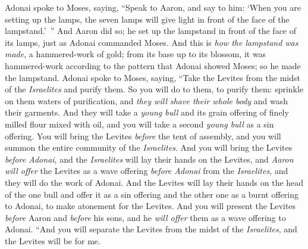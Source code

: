 \begin{biblechapter} %
 Adonai spoke to Moses, saying,
\verse “Speak to Aaron, and say to him: ‘When you are setting up the lamps, the seven lamps will give light in front of the face of the lampstand.’ ”
\verse And Aaron did so; he set up the lampstand in front of the face of its lamps, just as Adonai commanded Moses.
\verse And this is \textit{how the lampstand was made}, a hammered-work of gold; from its base up to its blossom, it was hammered-work according to the pattern that Adonai showed Moses; so he made the lampstand.
 Adonai spoke to Moses, saying,
\verse “Take the Levites from the midst of the \textit{Israelites} and purify them.
\verse So you will do to them, to purify them: sprinkle on them waters of purification, and \textit{they will shave their whole body} and wash their garments.
\verse And they will take a \textit{young bull} and its grain offering of finely milled flour mixed with oil, and you will take a second \textit{young bull} as a sin offering.
\verse You will bring the Levites \textit{before} the tent of assembly, and you will summon the entire community of the \textit{Israelites}.
\verse And you will bring the Levites \textit{before Adonai}, and the \textit{Israelites} will lay their hands on the Levites,
\verse and \textit{Aaron will offer} the Levites as a wave offering \textit{before Adonai} from the \textit{Israelites}, and they will do the work of Adonai.
\verse And the Levites will lay their hands on the head of the one bull and offer it as a sin offering and the other one as a burnt offering to Adonai, to make atonement for the Levites.
\verse And you will present the Levites \textit{before} Aaron and \textit{before} his sons, and he \textit{will offer} them as a wave offering to Adonai.
\verse “And you will separate the Levites from the midst of the \textit{Israelites}, and the Levites will be for me.

\end{biblechapter}
